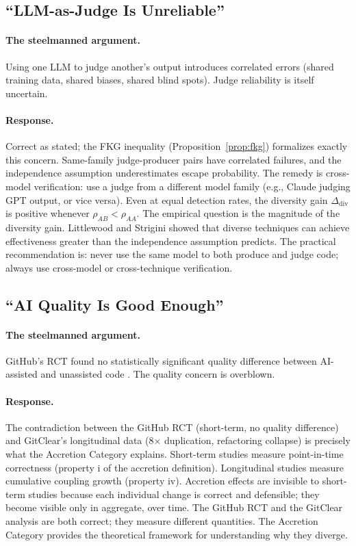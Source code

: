\documentclass[11pt, a4paper, logo, copyright]{googledeepmind}
\begin{document}
\subsection{``LLM-as-Judge Is Unreliable''}

\paragraph{The steelmanned argument.} Using one LLM to judge another's output introduces correlated errors (shared training data, shared biases, shared blind spots). Judge reliability is itself uncertain.

\paragraph{Response.} Correct as stated; the FKG inequality (Proposition~\ref{prop:fkg}) formalizes exactly this concern. Same-family judge-producer pairs have correlated failures, and the independence assumption underestimates escape probability. The remedy is cross-model verification: use a judge from a different model family (e.g., Claude judging GPT output, or vice versa). Even at equal detection rates, the diversity gain $\Delta_{\mathrm{div}}$ is positive whenever $\rho_{AB} < \rho_{AA}$. The empirical question is the magnitude of the diversity gain. Littlewood and Strigini \citep{littlewood1993} showed that diverse techniques can achieve effectiveness greater than the independence assumption predicts. The practical recommendation is: never use the same model to both produce and judge code; always use cross-model or cross-technique verification.

\subsection{``AI Quality Is Good Enough''}

\paragraph{The steelmanned argument.} GitHub's RCT found no statistically significant quality difference between AI-assisted and unassisted code \citep{github2024rct}. The quality concern is overblown.

\paragraph{Response.} The contradiction between the GitHub RCT (short-term, no quality difference) and GitClear's longitudinal data (8$\times$ duplication, refactoring collapse) is precisely what the Accretion Category explains. Short-term studies measure point-in-time correctness (property i of the accretion definition). Longitudinal studies measure cumulative coupling growth (property iv). Accretion effects are invisible to short-term studies because each individual change is correct and defensible; they become visible only in aggregate, over time. The GitHub RCT and the GitClear analysis are both correct; they measure different quantities. The Accretion Category provides the theoretical framework for understanding why they diverge.
\end{document}
